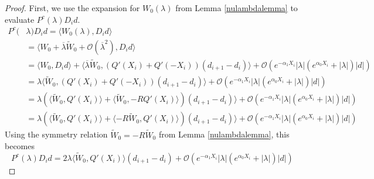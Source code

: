 \documentclass[thesis.tex]{subfiles}
\begin{document}
\begin{lemma}
\begin{proof}
First, we use the expansion for $W_0(\lambda)$ from Lemma \ref{nulambdalemma} to evaluate $P^c(\lambda)D_i d$.
\begin{align*}
P^c(&\lambda)D_i d = \langle W_0(\lambda), D_i d \rangle \\
&= \langle W_0 + \overline{\lambda} \tilde{W}_0 + \mathcal{O}(\overline{\lambda}^2), D_i d \rangle \\
&= \langle W_0, D_i d \rangle + \langle \overline{\lambda} \tilde{W}_0, (Q'(X_i) + Q'(-X_i))(d_{i+1} - d_i ) \rangle + \mathcal{O}(e^{-\alpha_1 X_i} |\lambda|(e^{\alpha_0 X_i} + |\lambda|)|d|) \\
&= \lambda \langle \tilde{W}_0, (Q'(X_i) + Q'(-X_i))(d_{i+1} - d_i ) \rangle + \mathcal{O}(e^{-\alpha_1 X_i} |\lambda|(e^{\alpha_0 X_i} + |\lambda|)|d|) \\
&= \lambda ( \langle \tilde{W}_0, Q'(X_i) \rangle + \langle \tilde{W}_0, -R Q'(X_i)\rangle )(d_{i+1} - d_i ) \rangle + \mathcal{O}(e^{-\alpha_1 X_i} |\lambda|(e^{\alpha_0 X_i} + |\lambda|)|d|)\\
&= \lambda ( \langle \tilde{W}_0, Q'(X_i) \rangle + \langle -R \tilde{W}_0, Q'(X_i)\rangle )(d_{i+1} - d_i ) \rangle + \mathcal{O}(e^{-\alpha_1 X_i} |\lambda|(e^{\alpha_0 X_i} + |\lambda|)|d|)
\end{align*}
Using the symmetry relation $\tilde{W}_0 = -R \tilde{W}_0$ from Lemma \ref{nulambdalemma}, this becomes
\begin{equation}\label{PcDid2}
P^c(\lambda)D_i d = 2 \lambda \langle \tilde{W}_0, Q'(X_i) \rangle (d_{i+1} - d_i ) + \mathcal{O}(e^{-\alpha_1 X_i} |\lambda|(e^{\alpha_0 X_i} + |\lambda|)|d|)
\end{equation}


\end{proof}
\end{lemma}
\end{document}
